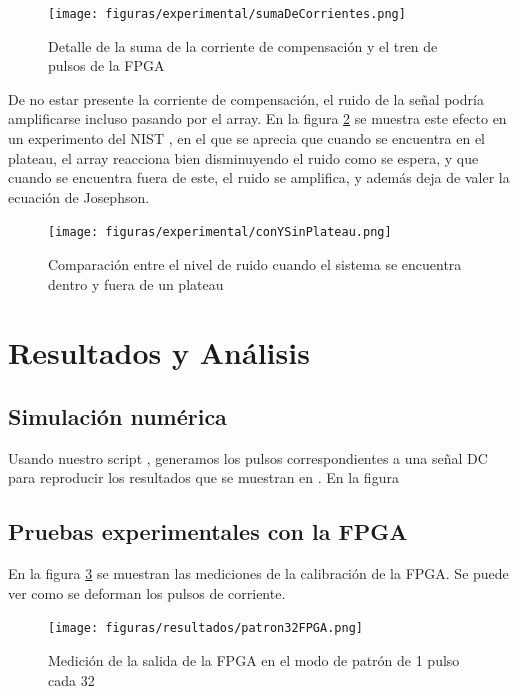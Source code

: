 \documentclass[twoside]{article}
\begin{document}
\begin{multicols}{2}
\begin{figure}[H]
    \centering
    \texttt{[image: figuras/experimental/sumaDeCorrientes.png]}
    \caption{Detalle de la suma de la corriente de compensación y el tren de pulsos de la FPGA}
    \label{fig:experimental_sumaDeCorrientes}
\end{figure}

De no estar presente la corriente de compensación, el ruido de la señal podría amplificarse incluso pasando por el array. En la figura \ref{fig:experimental_conYSinPlateau} se muestra este efecto en un experimento del NIST \cite{quantumLockingRangesNIST}, en el que se aprecia que cuando se encuentra en el plateau, el array reacciona bien disminuyendo el ruido como se espera, y que cuando se encuentra fuera de este, el ruido se amplifica, y además deja de valer la ecuación de Josephson.

\begin{figure}[H]
    \centering
    \texttt{[image: figuras/experimental/conYSinPlateau.png]}
    \caption{Comparación entre el nivel de ruido cuando el sistema se encuentra dentro y fuera de un plateau}
    \label{fig:experimental_conYSinPlateau}
\end{figure}

\section{Resultados y Análisis}

    \subsection{Simulación numérica}

    Usando nuestro script \cite{script}, generamos los pulsos correspondientes a una señal DC para reproducir los resultados que se muestran en \cite{aziz1996}. En la figura 

    \subsection{Pruebas experimentales con la FPGA}

    En la figura \ref{fig:resultados_patron32FPGA} se muestran las mediciones de la calibración de la FPGA. Se puede ver como se deforman los pulsos de corriente.

    \begin{figure}[H]
        \centering
        \texttt{[image: figuras/resultados/patron32FPGA.png]}
        \caption{Medición de la salida de la FPGA en el modo de patrón de 1 pulso cada 32}
        \label{fig:resultados_patron32FPGA}
    \end{figure}


\end{multicols}
\end{document}

